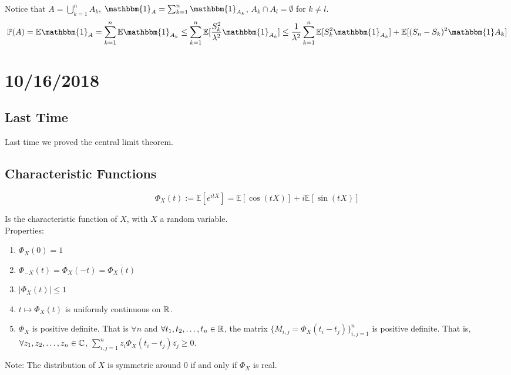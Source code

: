 \documentclass[english, 11pt]{article}
\begin{document}
Notice that $A = \bigcup_{k = 1}^n A_k$, $\mathbbm{1}_A = \sum_{k=1}^n \mathbbm{1}_{A_k}$, $A_k \cap A_l = \emptyset$ for $k \neq l$.\\

\[\mathbb{P}(A) = \mathbb{E}\mathbbm{1}_A = \sum_{k = 1}^n \mathbb{E}\mathbbm{1}_{A_k} \leq \sum_{k = 1}^n \mathbb{E}[\frac{S_k^2}{\lambda^2} \mathbbm{1}_{A_k}] \leq \frac{1}{\lambda^2} \sum_{k=1}^n \mathbb{E}[S_k^2 \mathbbm{1}_{A_k}] + \mathbb{E}[(S_n - S_k)^2 \mathbbm{1}A_k]\]

\section{10/16/2018}

\subsection{Last Time}

Last time we proved the central limit theorem.

\subsection{Characteristic Functions}

\[\Phi_X(t) := \mathbb{E}[e^{itX}] = \mathbb{E}[\cos(tX)] + i \mathbb{E}[\sin(tX)]\]

Is the characteristic function of $X$, with $X$ a random variable.\\

Properties:

\begin{enumerate}
	\item $\Phi_X(0) = 1$
	\item $\Phi_{-X}(t) = \Phi_X(-t) = \overline{\Phi_X(t)}$
	\item $|\Phi_X(t)| \leq 1$
	\item $t \mapsto \Phi_X(t)$ is uniformly continuous on ${\mathbb{R}}$.
	\item $\Phi_X$ is positive definite. That is $\forall n$ and $\forall t_1, t_2, \dots, t_n \in {\mathbb{R}}$, the matrix $\{M_{i, j} = \Phi_X(t_i - t_j)\}_{i, j = 1}^n$ is positive definite. That is, $\forall z_1, z_2, \dots, z_n \in {\mathbb{C}}$, $\sum_{i, j = 1}^n z_i \Phi_X(t_i - t_j)\overline{z_j} \geq 0$.
\end{enumerate}

Note: The distribution of $X$ is symmetric around $0$ if and only if $\Phi_X$ is real.\\ 
\end{document}
